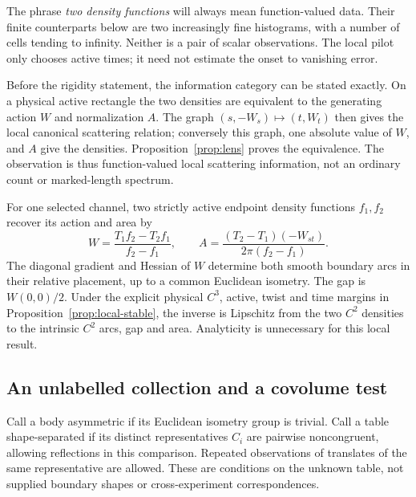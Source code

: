 The phrase \emph{two density functions} will always mean function-valued
data. Their finite counterparts below are two increasingly fine
histograms, with a number of cells tending to infinity. Neither is a
pair of scalar observations. The local pilot only chooses active times;
it need not estimate the onset to vanishing error.

Before the rigidity statement, the information category can be stated
exactly. On a physical active rectangle the two densities are equivalent
to the generating action $W$ and normalization $A$. The graph
$(s,-W_s)\mapsto(t,W_t)$ then gives the local canonical scattering
relation; conversely this graph, one absolute value of $W$, and $A$
give the densities. Proposition~\ref{prop:lens} proves the equivalence.
The observation is thus function-valued local scattering information,
not an ordinary count or marked-length spectrum.

\begin{theorem}\label{thm:local-main}
For one selected channel, two strictly active endpoint density functions
$f_1,f_2$ recover its action and area by
\begin{equation}\label{eq:ratio-main}
 W=\frac{T_1f_2-T_2f_1}{f_2-f_1},\qquad
 A=\frac{(T_2-T_1)(-W_{st})}{2\pi(f_2-f_1)}.
\end{equation}
The diagonal gradient and Hessian of $W$ determine both smooth boundary
arcs in their relative placement, up to a common Euclidean isometry.
The gap is $W(0,0)/2$. Under the explicit physical $C^3$, active,
twist and time margins in Proposition~\ref{prop:local-stable}, the
inverse is Lipschitz from the two $C^2$ densities to the intrinsic
$C^2$ arcs, gap and area. Analyticity is unnecessary for this local result.
\end{theorem}

\subsection{An unlabelled collection and a covolume test}
Call a body asymmetric if its Euclidean isometry group is trivial.
Call a table shape-separated if its distinct representatives $C_i$
are pairwise noncongruent, allowing reflections in this comparison.
Repeated observations of translates of the same representative are
allowed. These are conditions on the unknown table, not supplied
boundary shapes or cross-experiment correspondences.

